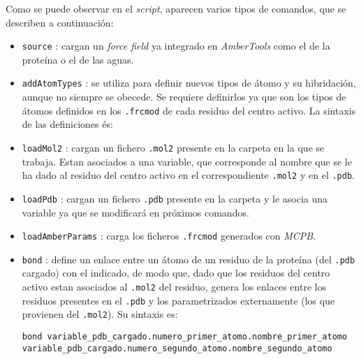             \noindent Como se puede observar en el \textit{script}, aparecen varios tipos de comandos, que se describen a continuación:
            \begin{itemize}
                \item   \texttt{source} : cargan un \textit{force field} ya integrado en \textit{AmberTools} como el de la proteína o el de las aguas.
                
                \item   \texttt{addAtomTypes} : se utiliza para definir nuevos tipos de átomo y su hibridación, aunque no siempre se obecede. Se requiere definirlos ya que son los tipos de átomos definidos en los \texttt{.frcmod} de cada residuo del centro activo. La sintaxis de las definiciones és:
                    \texttt{}
                    
                \item   \texttt{loadMol2} : cargan un fichero \texttt{.mol2} presente en la carpeta en la que se trabaja. Estan asociados a una variable, que corresponde al nombre que se le ha dado al residuo del centro activo en el correspondiente \texttt{.mol2} y en el \texttt{.pdb}.
                
                \item   \texttt{loadPdb} : cargan un fichero \texttt{.pdb} presente en la carpeta y le asocia una variable ya que se modificará en próximos comandos.
                
                \item   \texttt{loadAmberParams} : carga los ficheros \texttt{.frcmod} generados con \textit{MCPB}.
                
                \item   \texttt{bond} : define un enlace entre un átomo de un residuo de la proteína (del \texttt{.pdb} cargado) con el indicado, de modo que, dado que los residuos del centro activo estan asociados al \texttt{.mol2} del residuo, genera los enlaces entre los residuos presentes en el \texttt{.pdb} y los parametrizados externamente (los que provienen del \texttt{.mol2}). Su sintaxis es:
                    \begin{center}
                        \texttt{bond variable\_pdb\_cargado.numero\_primer\_atomo.nombre\_primer\_atomo variable\_pdb\_cargado.numero\_segundo\_atomo.nombre\_segundo\_atomo}
                    \end{center}
                    

\end{itemize}
